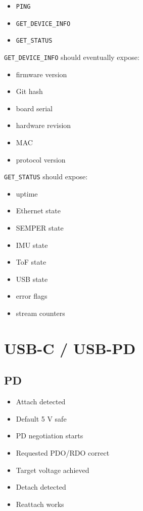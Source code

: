 \documentclass[10pt,a4paper,oneside]{report}
\providecommand{\tightlist}{\setlength{\itemsep}{1pt}\setlength{\parskip}{1pt}}
\begin{document}
\begin{itemize}
\tightlist
\item[$\square$]
  \texttt{PING}
\item[$\square$]
  \texttt{GET\_\allowbreak{}DEVICE\_\allowbreak{}INFO}
\item[$\square$]
  \texttt{GET\_\allowbreak{}STATUS}
\end{itemize}

\texttt{GET\_\allowbreak{}DEVICE\_\allowbreak{}INFO} should eventually expose:

\begin{itemize}
\tightlist
\item
  firmware version
\item
  Git hash
\item
  board serial
\item
  hardware revision
\item
  MAC
\item
  protocol version
\end{itemize}

\texttt{GET\_\allowbreak{}STATUS} should expose:

\begin{itemize}
\tightlist
\item
  uptime
\item
  Ethernet state
\item
  SEMPER state
\item
  IMU state
\item
  ToF state
\item
  USB state
\item
  error flags
\item
  stream counters
\end{itemize}

\section{USB-C / USB-PD}\label{wiki-hardware-bring-up-and-testing--13-usb-c--usb-pd}

\subsection{PD}\label{wiki-hardware-bring-up-and-testing--131-pd}

\begin{itemize}
\tightlist
\item[$\square$]
  Attach detected
\item[$\square$]
  Default 5 V safe
\item[$\square$]
  PD negotiation starts
\item[$\square$]
  Requested PDO/RDO correct
\item[$\square$]
  Target voltage achieved
\item[$\square$]
  Detach detected
\item[$\square$]
  Reattach works
\end{itemize}
\end{document}
